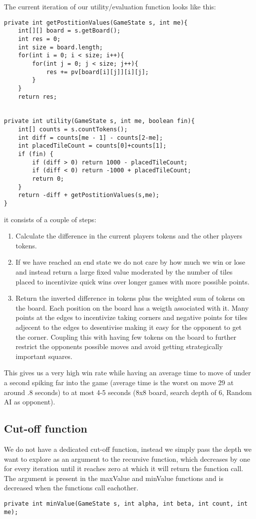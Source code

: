 \documentclass{article}
\begin{document}
The current iteration of our utility/evaluation function looks like this:
\begin{verbatim}
private int getPostitionValues(GameState s, int me){
    int[][] board = s.getBoard();
    int res = 0;
    int size = board.length;
    for(int i = 0; i < size; i++){
        for(int j = 0; j < size; j++){
            res += pv[board[i][j]][i][j];
        }
    }
    return res;


private int utility(GameState s, int me, boolean fin){
    int[] counts = s.countTokens();
    int diff = counts[me - 1] - counts[2-me];
    int placedTileCount = counts[0]+counts[1];
    if (fin) {
        if (diff > 0) return 1000 - placedTileCount;
        if (diff < 0) return -1000 + placedTileCount;
        return 0;
    }
    return -diff + getPostitionValues(s,me);
}

\end{verbatim}
it consists of a couple of steps:
\begin{enumerate}
    \item Calculate the difference in the current players tokens and the other players tokens.
    \item If we have reached an end state we do not care by how much we win or lose and instead return a large fixed value moderated by the number of tiles placed to incentivize quick wins over longer games with more possible points.
    \item Return the inverted difference in tokens plus the weighted sum of tokens on the board. Each position on the board has a weigth associated with it. Many points at the edges to incentivize taking corners and negative points for tiles adjecent to the edges to desentivise making it easy for the opponent to get the corner. Coupling this with having few tokens on the board to further restrict the opponents possible moves and avoid getting strategically important squares.
\end{enumerate}
This gives us a very high win rate while having an average time to move of 
under a second spiking far into the game (average time is the worst on move 29 at around .8 seconds) to at most 4-5 seconds (8x8 board, search depth of 6, Random AI as opponent).



\subsection{Cut-off function}
We do not have a dedicated cut-off function, instead we simply pass the depth we want to explore as an argument to the recursive function, which decreases by one for every iteration until it reaches zero at which it will return the function call.
The argument is present in the maxValue and minValue functions and is decreased when the functions call eachother.



\begin{verbatim}
private int minValue(GameState s, int alpha, int beta, int count, int me);
\end{verbatim}
\end{document}
